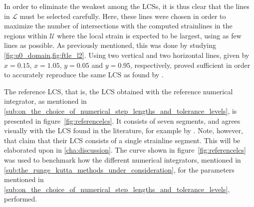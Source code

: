 In order to eliminate the weakest among the LCSs, it is thus clear that the
lines in $\mathcal{L}$ must be selected carefully. Here, these lines were
chosen in order to maximize the number of intersections with the computed
strainlines in the regions within $\mathcal{U}$ where the local strain is
expected to be largest, using as few lines as possible. As previously mentioned,
this was done by studying \cref{fig:u0_domain,fig:ftle_l2}.
Using two vertical and two horizontal lines, given by $x=0.15$, $x=1.05$,
$y=0.05$ and $y=0.95$, respectively, proved sufficient in order to
accurately reproduce the same LCS as found by \textcite{farazmand2012computing}.




\clearpage
The reference LCS, that is, the LCS obtained with the reference numerical
integrator, as mentioned in
\cref{sub:on_the_choice_of_numerical_step_lengths_and_tolerance_levels}, is
presented in figure~\ref{fig:referencelcs}. It consists of seven segments,
and agrees visually with the LCS found in the literature, for example by
\textcite{farazmand2012computing}. Note, however, that
\citeauthor{farazmand2012computing} claim that their LCS consists of a single
strainline segment. This will be elaborated upon in
\cref{cha:discussion}. The curve shown in figure~\ref{fig:referencelcs} was used to
benchmark how the different numerical integrators, mentioned in
\cref{sub:the_runge_kutta_methods_under_consideration}, for the parameters
mentioned in
\cref{sub:on_the_choice_of_numerical_step_lengths_and_tolerance_levels},
performed.





